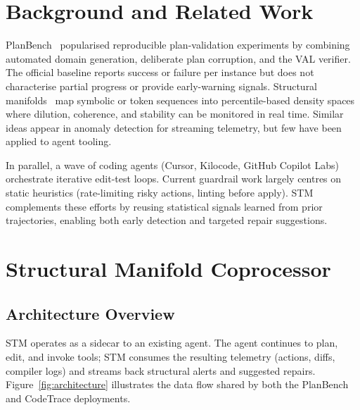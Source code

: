 \documentclass[11pt]{article}
\begin{document}
\section{Background and Related Work}
PlanBench~\cite{planbench} popularised reproducible plan-validation experiments by combining automated domain generation, deliberate plan corruption, and the VAL verifier. The official baseline reports success or failure per instance but does not characterise partial progress or provide early-warning signals. Structural manifolds~\cite{stm-manifold} map symbolic or token sequences into percentile-based density spaces where dilution, coherence, and stability can be monitored in real time. Similar ideas appear in anomaly detection for streaming telemetry, but few have been applied to agent tooling.

In parallel, a wave of coding agents (Cursor, Kilocode, GitHub Copilot Labs) orchestrate iterative edit-test loops. Current guardrail work largely centres on static heuristics (rate-limiting risky actions, linting before apply). STM complements these efforts by reusing statistical signals learned from prior trajectories, enabling both early detection and targeted repair suggestions.

\section{Structural Manifold Coprocessor}
\subsection{Architecture Overview}
STM operates as a sidecar to an existing agent. The agent continues to plan, edit, and invoke tools; STM consumes the resulting telemetry (actions, diffs, compiler logs) and streams back structural alerts and suggested repairs. Figure~\ref{fig:architecture} illustrates the data flow shared by both the PlanBench and CodeTrace deployments.
\end{document}
